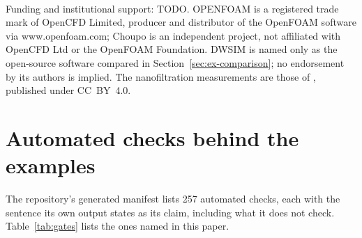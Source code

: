 \documentclass[preprint,12pt]{elsarticle}
\begin{document}
Funding and institutional support: TODO.
OPENFOAM\textsuperscript{\textregistered} is a registered trade mark of
OpenCFD Limited, producer and distributor of the OpenFOAM software via
www.openfoam.com; Choupo is an independent project, not affiliated with
OpenCFD Ltd or the OpenFOAM Foundation.  DWSIM is named only as the
open-source software compared in Section~\ref{sec:ex-comparison}; no
endorsement by its authors is implied.  The nanofiltration measurements are
those of \citet{fdl2021}, published under CC~BY~4.0.

\appendix
\setcounter{table}{0}
\section{Automated checks behind the examples}
\label{app:gates}

The repository's generated manifest lists 257 automated checks, each with
the sentence its own output states as its claim, including what it does
not check.  Table~\ref{tab:gates} lists the ones named in this paper.
\end{document}

